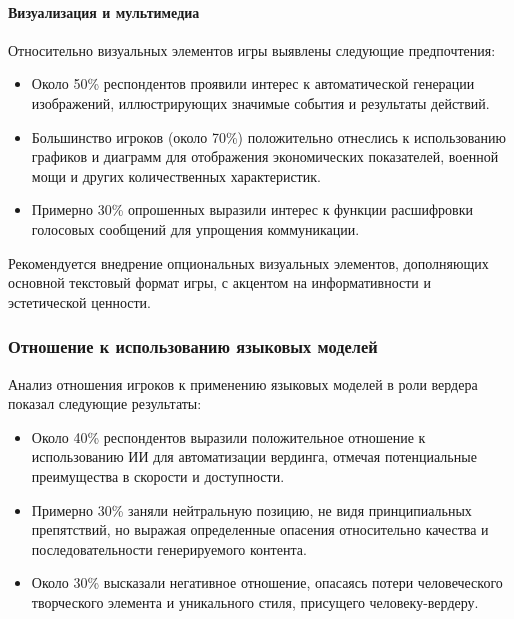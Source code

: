 \paragraph{Визуализация и мультимедиа}

Относительно визуальных элементов игры выявлены следующие предпочтения:

\begin{itemize}
    \item Около 50\% респондентов проявили интерес к автоматической генерации изображений, иллюстрирующих значимые события и результаты действий.

    \item Большинство игроков (около 70\%) положительно отнеслись к использованию графиков и диаграмм для отображения экономических показателей, военной мощи и других количественных характеристик.

    \item Примерно 30\% опрошенных выразили интерес к функции расшифровки голосовых сообщений для упрощения коммуникации.
\end{itemize}

Рекомендуется внедрение опциональных визуальных элементов, дополняющих основной текстовый формат игры, с акцентом на информативности и эстетической ценности.

\subsubsection{Отношение к использованию языковых моделей}

Анализ отношения игроков к применению языковых моделей в роли вердера показал следующие результаты:

\begin{itemize}
    \item Около 40\% респондентов выразили положительное отношение к использованию ИИ для автоматизации вердинга, отмечая потенциальные преимущества в скорости и доступности.

    \item Примерно 30\% заняли нейтральную позицию, не видя принципиальных препятствий, но выражая определенные опасения относительно качества и последовательности генерируемого контента.

    \item Около 30\% высказали негативное отношение, опасаясь потери человеческого творческого элемента и уникального стиля, присущего человеку-вердеру.
\end{itemize}

